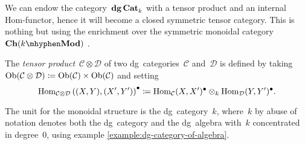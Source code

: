 We can endow the category~$\mathbf{dg\,Cat}_k$ with a tensor product and an internal Hom-functor, hence it will become a closed symmetric tensor category. This is nothing but using the enrichment over the symmetric monoidal category~$\Ch(k\mhyphen\Mod)$ \cite[Section~1.4]{lnm145}.
\begin{definition}
  The \emph{tensor product}~$\mathcal{C}\otimes\mathcal{D}$ of two dg~categories~$\mathcal{C}$ and~$\mathcal{D}$ is defined by taking~$\mathrm{Ob}(\mathcal{C}\otimes\mathcal{D})\coloneqq\mathrm{Ob}(\mathcal{C})\times\mathrm{Ob}(\mathcal{C})$ and setting
  \begin{equation}
    \label{equation:tensor-product-dg-categories}
    \mathrm{Hom}_{\mathcal{C}\otimes\mathcal{D}}\left( (X,Y),(X',Y') \right)^\bullet\coloneqq\mathrm{Hom}_{\mathcal{C}}(X,X')^\bullet\otimes_k\mathrm{Hom}_{\mathcal{D}}(Y,Y')^\bullet.
  \end{equation}
\end{definition}
\begin{remark}
  \label{remark:unit-monoidal-structure}
  The unit for the monoidal structure is the dg~category~$k$, where~$k$ by abuse of notation denotes both the dg~category and the dg~algebra with~$k$ concentrated in degree~$0$, using example \ref{example:dg-category-of-algebra}.
\end{remark}

